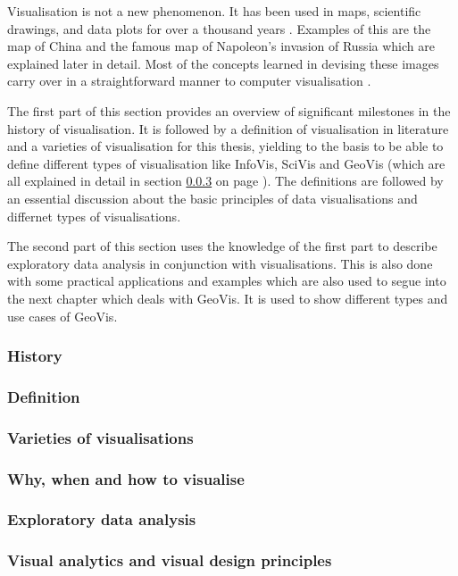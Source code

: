 Visualisation is not a new phenomenon. It has been used in maps, scientific drawings, and data plots for over a thousand years . Examples of this are the map of China and the famous map of Napoleon's invasion of Russia which are explained later in detail. Most of the concepts learned in devising these images carry over in a straightforward manner to computer visualisation .

The first part of this section provides an overview of significant milestones in the history of visualisation. It is followed by a definition of visualisation in literature and a varieties of visualisation for this thesis, yielding to the basis to be able to define different types of visualisation like \ac{InfoVis}, \ac{SciVis} and \ac{GeoVis} (which are all explained in detail in section \ref{s:definitions-types} on page \pageref{s:definitions-types}). The definitions are followed by an essential discussion about the basic principles of data visualisations and differnet types of visualisations.

The second part of this section uses the knowledge of the first part to describe exploratory data analysis in conjunction with visualisations. This is also done with some practical applications and examples which are also used to segue into the next chapter which deals with \ac{GeoVis}. It is used to show different types and use cases of \ac{GeoVis}.

\subsubsection{History}
\label{s:history}


\subsubsection{Definition}
\label{s:definition}


\subsubsection{Varieties of visualisations}
\label{s:definitions-types}


\subsubsection{Why, when and how to visualise}
\label{s:basics}


\subsubsection{Exploratory data analysis}
\label{s:eda}



\subsubsection{Visual analytics and visual design principles}
\label{s:va}

